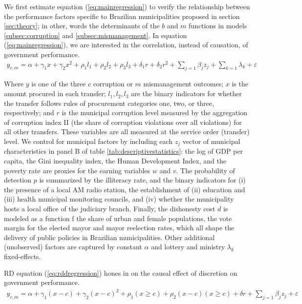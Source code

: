 \documentclass[11pt]{article}
\begin{document}
We first estimate equation (\ref{eq:mainregression}) to verify the relationship between the performance factors specific to Brazilian municipalities proposed in section \ref{sec:theory}; in other, words the determinants of the $b$ and $m$ functions in models \ref{subsec:corruption} and \ref{subsec:mismanagement}. In equation (\ref{eq:mainregression}), we are interested in the correlation, instead of causation, of government performance.
\begin{equation} \label{eq:mainregression}
  \begin{aligned}
    y_{c,m} = \alpha + \gamma_{1}x + \gamma_{2}x^{2} + \rho_{1}l_{1} + \rho_{2}l_{2} + \rho_{3}l_{3} + \delta_{1}r + \delta_{2}r^{2} + \sum_{j = 1} \beta_{j} z_{j} + \sum_{k = 1} \lambda_{k} + \varepsilon %
  \end{aligned}
\end{equation}

Where $y$ is one of the three $c$ corruption or $m$ mismanagement outcomes; $x$ is the amount procured in each transfer; $l_{1}, l_{2}, l_{3}$ are the binary indicators for whether the transfer follows rules of procurement categories one, two, or three, respectively; and $r$ is the municipal corruption level measured by the aggregation of corruption index II (the share of corruption violations over all violations) for all other transfers. These variables are all measured at the service order (transfer) level. We control for municipal factors by including each $z_{j}$ vector of municipal characteristics in panel B of table \ref{tab:descriptivestatistics}: the log of GDP per capita, the Gini inequality index, the Human Development Index, and the poverty rate are proxies for the earning variables $w$ and $v$. The probability of detection $p$ is summarized by the illiteracy rate, and the binary indicators for (i) the presence of a local AM radio station, the establishment of (ii) education and (iii) health municipal monitoring councils, and (iv) whether the municipality hosts a local office of the judiciary branch. Finally, the dishonesty cost $d$ is modeled as a function f the share of urban and female populations, the vote margin for the elected mayor and mayor reelection rates, which all shape the delivery of public policies in Brazilian municipalities. Other additional (unobserved) factors are captured by constant $\alpha$ and lottery and ministry $\lambda_{k}$ fixed-effects.

RD equation (\ref{eq:rddregression}) hones in on the causal effect of discretion on government performance.
\begin{equation} \label{eq:rddregression}
  \begin{aligned}
    y_{c,m} = \alpha + \gamma_{1}(x-c) + \gamma_{2}(x-c)^{2}+ \rho_{1}(x \geq c) + \rho_{2} (x-c) (x \geq c) + \delta r + \sum_{j = 1} \beta_{j} z_{j} + \varepsilon
  \end{aligned}
\end{equation}
\end{document}
